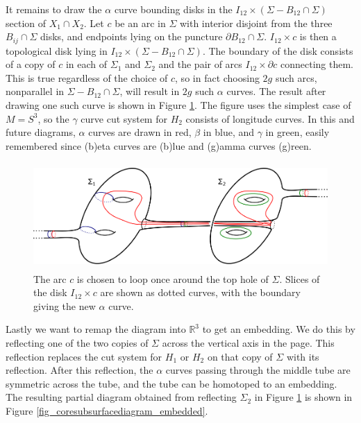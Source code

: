 \documentclass[12pt]{amsart}
\newcommand{\R}{\mathbb{R}}
\newcommand{\del}{\partial }
\theoremstyle{definition}
\theoremstyle{remark}
\begin{document}
It remains to draw the $\alpha$ curve bounding disks in the $I_{12} \times (\Sigma - B_{12} \cap \Sigma)$ section of $X_1 \cap X_2$.   Let $c$ be an arc in $\Sigma$ with interior disjoint from the three $B_{ij} \cap \Sigma$ disks, and endpoints lying on the puncture $\del B_{12} \cap \Sigma$.  $I_{12} \times c$ is then a topological disk lying in $I_{12} \times (\Sigma - B_{12} \cap \Sigma)$.  The boundary of the disk consists of a copy of $c$ in each of $\Sigma_1$ and $\Sigma_2$ and the pair of arcs $I_{12} \times \del c$ connecting them.  This is true regardless of the choice of $c$, so in fact choosing $2g$ such arcs, nonparallel in $\Sigma - B_{12} \cap \Sigma$, will result in $2g$ such $\alpha$ curves.  The result after drawing one such curve is shown in Figure \ref{fig_coresubsurfacediagram}.  The figure uses the simplest case of $M = S^3$, so the $\gamma$ curve cut system for $H_2$ consists of longitude curves.  In this and future diagrams, $\alpha$ curves are drawn in red, $\beta$ in blue, and $\gamma$ in green, easily remembered since (b)eta curves are (b)lue and (g)amma curves (g)reen.

\begin{figure}[h]
\centering
\includegraphics[height=1.6in]{coresubsurfacediagram.png}
\caption{The arc $c$ is chosen to loop once around the top hole of $\Sigma$.  Slices of the disk $I_{12} \times c$ are shown as dotted curves, with the boundary giving the new $\alpha$ curve.}
\label{fig_coresubsurfacediagram}
\end{figure}

Lastly we want to remap the diagram into $\R^3$ to get an embedding.  We do this by reflecting one of the two copies of $\Sigma$ across the vertical axis in the page.  This reflection replaces the cut system for $H_1$ or $H_2$ on that copy of $\Sigma$ with its reflection.  After this reflection, the $\alpha$ curves passing through the middle tube are symmetric across the tube, and the tube can be homotoped to an embedding.  The resulting partial diagram obtained from reflecting $\Sigma_2$ in Figure \ref{fig_coresubsurfacediagram} is shown in Figure \ref{fig_coresubsurfacediagram_embedded}.
\end{document}
